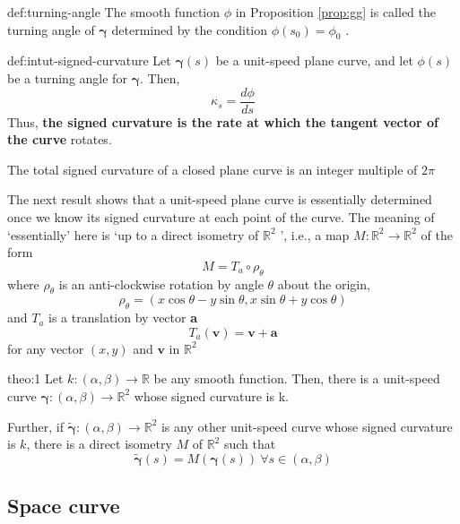 \documentclass{notes}
\begin{document}
\begin{definition}{def:turning-angle}
The smooth function \(\phi\) in Proposition \ref{prop:gg} is called the turning angle of \(\bm{\gamma}\)
determined by the condition \(\phi(s_0) = \phi_0\) .
\end{definition}

\begin{proposition}{def:intut-signed-curvature}
Let \(\bm{\gamma}(s)\) be a unit-speed plane curve, and let \(\phi(s)\) be a turning angle for \(\bm{\gamma}\).
Then,
\[\kappa _s = \dfrac{d\phi}{ds}\]
Thus, \textbf{the signed curvature is the rate at which the tangent vector of the
curve} rotates.
\end{proposition}

\begin{corollary}{}
	The total signed curvature of a closed plane curve is an integer multiple of \(2\pi\)
\end{corollary}
\par 

The next result shows that a unit-speed plane curve is essentially determined
once we know its signed curvature at each point of the curve. The meaning of
`essentially’ here is `up to a direct isometry of \(\mathbb{R}^2\) ’, i.e., a map \(M: \mathbb{R}^2 \to \mathbb{R}^2\) of
the form
\[M  = T_a \circ \rho_\theta\]
where \(\rho _\theta\) is an anti-clockwise rotation by angle \(\theta\) about the origin,
\[\rho _\theta  = (x\cos \theta - y \sin \theta, x \sin \theta + y \cos \theta)\]
and \(T_a\) is a translation by vector \textbf{a}
\[T_a (\mathbf{v}) = \mathbf{v}+ \mathbf{a}\]
for any vector \((x, y) \) and \(\mathbf{v}\) in \(\mathbb{R}^2\)


\begin{theorem}{theo:1}
	Let \(k : (\alpha, \beta) \to \mathbb{R}\) be any smooth function. Then, there is a unit-speed curve
	 \(\bm{\gamma}:(\alpha, \beta)\to \mathbb{R}^2\) whose signed curvature is  k.
	
	Further, if \(\tilde{\bm{\gamma}}: (\alpha, \beta)\to \mathbb{R}^2\) is any other unit-speed curve 
	whose signed curvature is \(k\), there is a direct isometry \(M\) of \(\mathbb{R}^2\) such that
	\[\tilde{\bm{\gamma}}(s) = M(\bm{\gamma}(s)) \ \forall s \in (\alpha, \beta) \]
\end{theorem}

\subsection{Space curve}
\end{document}
